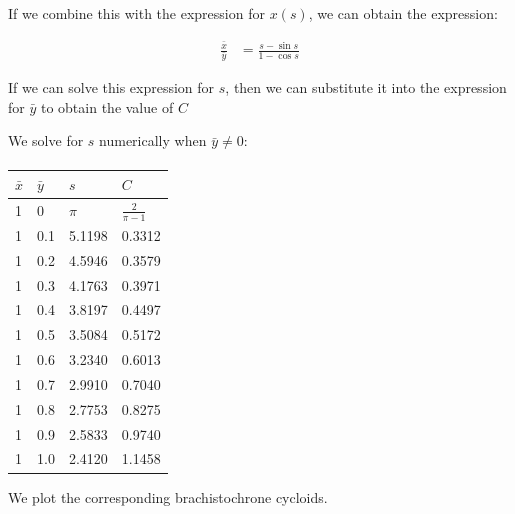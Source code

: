 \documentclass{article}
\begin{document}
If we combine this with the expression for $x(s)$, we can obtain the expression:

\begin{align}
\frac {\bar{x}} {\bar{y}} & = \frac {s - \sin s}{1 - \cos s}
\end{align}

If we can solve this expression for $s$, then we can substitute it into the 
	expression for $\bar{y}$ to obtain the value of $C$


We solve for $s$ numerically when $\bar{y} \neq 0$:

\paragraph{}
\begin{tabular}{ l | l | l | l}
$\bar{x}$ & $\bar{y}$ & $s$ & $C$ \\
\hline
1 & 0 & $\pi$ & $\frac 2 {\pi - 1}$ \\
1 & 0.1 & 5.1198 & 0.3312 \\
1 & 0.2 & 4.5946 & 0.3579 \\
1 & 0.3 & 4.1763 & 0.3971 \\
1 & 0.4 & 3.8197 & 0.4497 \\
1 & 0.5 & 3.5084 & 0.5172 \\
1 & 0.6 & 3.2340 & 0.6013 \\
1 & 0.7 & 2.9910 & 0.7040 \\
1 & 0.8 & 2.7753 & 0.8275 \\
1 & 0.9 & 2.5833 & 0.9740 \\
1 & 1.0 & 2.4120 & 1.1458 \\
\end{tabular}

We plot the corresponding brachistochrone cycloids.
\end{document}
